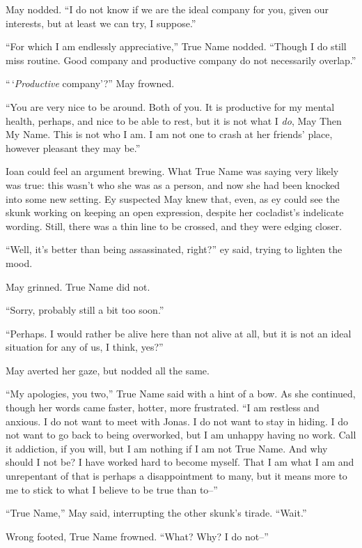 May nodded. ``I do not know if we are the ideal company for you, given our interests, but at least we can try, I suppose.''

``For which I am endlessly appreciative,'' True Name nodded. ``Though I do still miss routine. Good company and productive company do not necessarily overlap.''

``\,`\emph{Productive} company'?'' May frowned.

``You are very nice to be around. Both of you. It is productive for my mental health, perhaps, and nice to be able to rest, but it is not what I \emph{do}, May Then My Name. This is not who I am. I am not one to crash at her friends' place, however pleasant they may be.''

Ioan could feel an argument brewing. What True Name was saying very likely was true: this wasn't who she was as a person, and now she had been knocked into some new setting. Ey suspected May knew that, even, as ey could see the skunk working on keeping an open expression, despite her cocladist's indelicate wording. Still, there was a thin line to be crossed, and they were edging closer.

``Well, it's better than being assassinated, right?'' ey said, trying to lighten the mood.

May grinned. True Name did not.

``Sorry, probably still a bit too soon.''

``Perhaps. I would rather be alive here than not alive at all, but it is not an ideal situation for any of us, I think, yes?''

May averted her gaze, but nodded all the same.

``My apologies, you two,'' True Name said with a hint of a bow. As she continued, though her words came faster, hotter, more frustrated. ``I am restless and anxious. I do not want to meet with Jonas. I do not want to stay in hiding. I do not want to go back to being overworked, but I am unhappy having no work. Call it addiction, if you will, but I am nothing if I am not True Name. And why should I not be? I have worked hard to become myself. That I am what I am and unrepentant of that is perhaps a disappointment to many, but it means more to me to stick to what I believe to be true than to--''

``True Name,'' May said, interrupting the other skunk's tirade. ``Wait.''

Wrong footed, True Name frowned. ``What? Why? I do not--''

